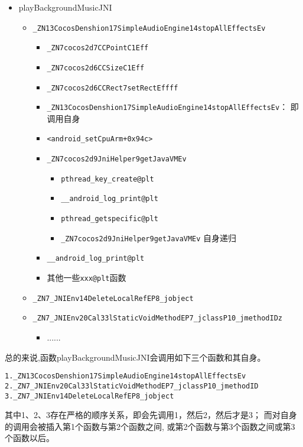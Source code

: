 \begin{itemize}
\item playBackgroundMusicJNI
  	\begin{itemize}
  	\item \verb|_ZN13CocosDenshion17SimpleAudioEngine14stopAllEffectsEv|
		\begin{itemize}
  		\item \verb|_ZN7cocos2d7CCPointC1Eff|
   		\item \verb|_ZN7cocos2d6CCSizeC1Eff|
   		\item \verb|_ZN7cocos2d6CCRect7setRectEffff|
  		\item \verb|_ZN13CocosDenshion17SimpleAudioEngine14stopAllEffectsEv|：
		即调用自身
		\item \verb|<android_setCpuArm+0x94c>|
		\item \verb|_ZN7cocos2d9JniHelper9getJavaVMEv|
  			\begin{itemize}
 			\item \verb|pthread_key_create@plt|
  			\item \verb|__android_log_print@plt|
  			\item \verb|pthread_getspecific@plt|
  			\item \verb|_ZN7cocos2d9JniHelper9getJavaVMEv| 自身递归
  			\end{itemize}
		\item \verb|__android_log_print@plt|
		\item 其他一些\verb|xxx@plt|函数
		\end{itemize}
   	\item \verb|_ZN7_JNIEnv14DeleteLocalRefEP8_jobject|
   	\item \verb|_ZN7_JNIEnv20Cal33lStaticVoidMethodEP7_jclassP10_jmethodIDz|
  		\begin{itemize}
  		\item ......
  		\end{itemize}
	\end{itemize}
\end{itemize}

总的来说,函数playBackgroundMusicJNI会调用如下三个函数和其自身。
\begin{lstlisting}
1._ZN13CocosDenshion17SimpleAudioEngine14stopAllEffectsEv
2._ZN7_JNIEnv20Cal33lStaticVoidMethodEP7_jclassP10_jmethodID
3._ZN7_JNIEnv14DeleteLocalRefEP8_jobject
\end{lstlisting}

其中1、2、3存在严格的顺序关系，即会先调用1，然后2，然后才是3；
而对自身的调用会被插入第1个函数与第2个函数之间,
或第2个函数与第3个函数之间或第3个函数以后。


